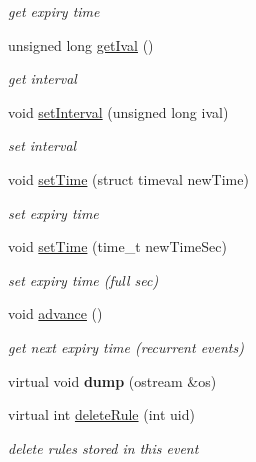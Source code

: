 \begin{DoxyCompactItemize}
\begin{DoxyCompactList}\small\item\em get expiry time \end{DoxyCompactList}\item 
\mbox{\label{classEvent_ab3c5d8d6c110eb033389638746a02ddd}} 
unsigned long \hyperlink{classEvent_ab3c5d8d6c110eb033389638746a02ddd}{get\+Ival} ()
\begin{DoxyCompactList}\small\item\em get interval \end{DoxyCompactList}\item 
\mbox{\label{classEvent_aab363fcc2a278a4c58e2d0d4bd61b4c4}} 
void \hyperlink{classEvent_aab363fcc2a278a4c58e2d0d4bd61b4c4}{set\+Interval} (unsigned long ival)
\begin{DoxyCompactList}\small\item\em set interval \end{DoxyCompactList}\item 
\mbox{\label{classEvent_aa539db91725efa367bc51bd20c6f6527}} 
void \hyperlink{classEvent_aa539db91725efa367bc51bd20c6f6527}{set\+Time} (struct timeval new\+Time)
\begin{DoxyCompactList}\small\item\em set expiry time \end{DoxyCompactList}\item 
\mbox{\label{classEvent_a1b15a8aed3a94f247adb883ecebc5cbd}} 
void \hyperlink{classEvent_a1b15a8aed3a94f247adb883ecebc5cbd}{set\+Time} (time\+\_\+t new\+Time\+Sec)
\begin{DoxyCompactList}\small\item\em set expiry time (full sec) \end{DoxyCompactList}\item 
\mbox{\label{classEvent_ac401a0dcd7f2dd526015285ac827f61b}} 
void \hyperlink{classEvent_ac401a0dcd7f2dd526015285ac827f61b}{advance} ()
\begin{DoxyCompactList}\small\item\em get next expiry time (recurrent events) \end{DoxyCompactList}\item 
\mbox{\label{classEvent_a1a0e50aa2d50ba782fb78c369c40762f}} 
virtual void {\bfseries dump} (ostream \&os)
\item 
\mbox{\label{classEvent_a1784b321b36147c83c469435629db298}} 
virtual int \hyperlink{classEvent_a1784b321b36147c83c469435629db298}{delete\+Rule} (int uid)
\begin{DoxyCompactList}\small\item\em delete rules stored in this event \end{DoxyCompactList}\end{DoxyCompactItemize}



